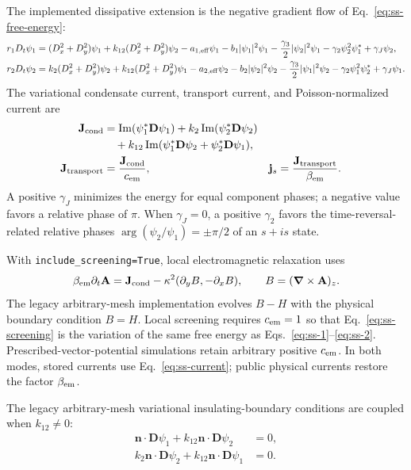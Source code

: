 \documentclass[11pt]{article}
\begin{document}
The implemented dissipative extension is the negative gradient flow of
Eq.~\eqref{eq:ss-free-energy}:
\begin{align}
    r_1D_t\psi_1={}&(D_x^2+D_y^2)\psi_1
      +k_{12}(D_x^2+D_y^2)\psi_2
      -a_{1,{\rm eff}}\psi_1-b_1|\psi_1|^2\psi_1
      -\frac{\gamma_3}{2}|\psi_2|^2\psi_1
      -\gamma_2\psi_2^2\psi_1^*+\gamma_J\psi_2,
    \label{eq:ss-1}\\
    r_2D_t\psi_2={}&k_2(D_x^2+D_y^2)\psi_2
      +k_{12}(D_x^2+D_y^2)\psi_1
      -a_{2,{\rm eff}}\psi_2-b_2|\psi_2|^2\psi_2
      -\frac{\gamma_3}{2}|\psi_1|^2\psi_2
      -\gamma_2\psi_1^2\psi_2^*+\gamma_J\psi_1.
    \label{eq:ss-2}
\end{align}
The variational condensate current, transport current, and Poisson-normalized
current are
\begin{align}
    \mathbf J_{\rm cond}
      &=\operatorname{Im}(\psi_1^*\mathbf D\psi_1)
        +k_2\operatorname{Im}(\psi_2^*\mathbf D\psi_2)\\
      &\quad+k_{12}\operatorname{Im}
        (\psi_1^*\mathbf D\psi_2+\psi_2^*\mathbf D\psi_1),\\
    \mathbf J_{\rm transport}&=\frac{\mathbf J_{\rm cond}}{c_{\rm em}},&
    \mathbf j_s&=\frac{\mathbf J_{\rm transport}}{\beta_{\rm em}}.
    \label{eq:ss-current}
\end{align}
A positive $\gamma_J$ minimizes the energy for equal component phases; a
negative value favors a relative phase of $\pi$.  When $\gamma_J=0$, a
positive $\gamma_2$ favors the time-reversal-related relative phases
$\arg(\psi_2/\psi_1)=\pm\pi/2$ of an $s+is$ state.

With \texttt{include\_screening=True}, local electromagnetic relaxation uses
\begin{equation}
  \beta_{\rm em}\partial_t\mathbf A
    =\mathbf J_{\rm cond}
      -\kappa^2(\partial_yB,-\partial_xB),
  \qquad B=(\boldsymbol\nabla\times\mathbf A)_z.
  \label{eq:ss-screening}
\end{equation}
The legacy arbitrary-mesh implementation evolves $B-H$ with the physical
boundary condition $B=H$.  Local
screening requires $c_{\rm em}=1$ so that Eq.~\eqref{eq:ss-screening} is the
variation of the same free energy as Eqs.~\eqref{eq:ss-1}--\eqref{eq:ss-2}.
Prescribed-vector-potential simulations retain arbitrary positive
$c_{\rm em}$.  In both modes, stored currents use Eq.~\eqref{eq:ss-current};
public physical currents restore the factor $\beta_{\rm em}$.

The legacy arbitrary-mesh variational insulating-boundary conditions are
coupled when $k_{12}\ne0$:
\begin{align}
  \mathbf n\!\cdot\!\mathbf D\psi_1
    +k_{12}\mathbf n\!\cdot\!\mathbf D\psi_2&=0,\\
  k_2\mathbf n\!\cdot\!\mathbf D\psi_2
    +k_{12}\mathbf n\!\cdot\!\mathbf D\psi_1&=0.
\end{align}
\end{document}
